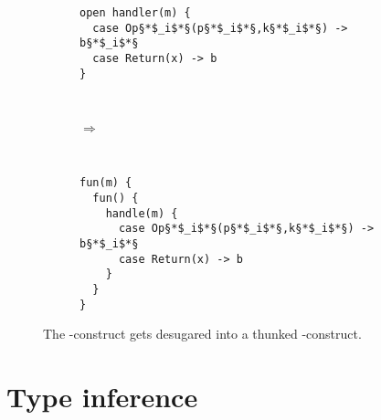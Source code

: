 \begin{figure}[h]
    \centering
    \begin{subfigure}[c]{0.45\textwidth}
        \centering
\begin{lstlisting}[style=links]
open handler(m) {
  case Op§*$_i$*§(p§*$_i$*§,k§*$_i$*§) -> b§*$_i$*§
  case Return(x) -> b
}
\end{lstlisting}        
    \end{subfigure}%
    ~ 
    \begin{subfigure}[c]{0.1\textwidth}
      $\Rightarrow$
    \end{subfigure}%
    ~
    \begin{subfigure}[c]{0.45\textwidth}
        \centering
\begin{lstlisting}[style=links]
fun(m) {
  fun() {
    handle(m) {
      case Op§*$_i$*§(p§*$_i$*§,k§*$_i$*§) -> b§*$_i$*§
      case Return(x) -> b
    }
  }
}
\end{lstlisting}       
    \end{subfigure}
\caption{The -construct gets desugared into a thunked -construct.}\label{fig:openhandler-desugar}
\end{figure}

\section{Type inference}
